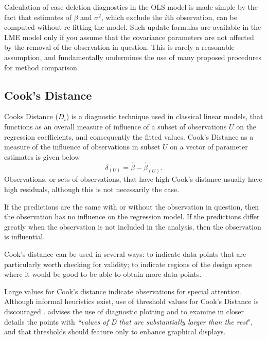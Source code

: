\documentclass[12pt, a4paper]{report}
\theoremstyle{definition}
\theoremstyle{remark}
\begin{document}
Calculation of case deletion diagnostics in the OLS model is made simple by the fact that estimates of $\beta$ and $\sigma^2$, which exclude the $i$th observation, can be computed without re-fitting the model. Such update formulas are available in the LME model only if you assume that the covariance parameters are not affected by the removal of the observation in question. This is rarely a reasonable assumption, and fundamentally undermines the use of many proposed procedures for method comparison.



\subsection{Cook's Distance}

 Cooks Distance ($D_{i}$) is a diagnostic technique used in classical linear models, that functions as an overall measure of influence of a subset of observations $U$ on the regression coefficients, and consequently the fitted values.  Cook's Distance as a measure of the influence of observations in subset $U$ on a vector of parameter estimates is given below \citep{cook77}
\[ \delta_{(U)} = \hat{\beta} - \hat{\beta}_{(U)}.\]
Observations, or sets of observations, that have high Cook's distance usually have high residuals, although this is not necessarily the case.


If the predictions are the same with or without the observation in question, then the observation has no influence on the regression model. If the predictions differ greatly when the observation is not included in the analysis, then the observation is influential.

 Cook's distance can be used in several ways: to indicate data points that are particularly worth checking for validity; to indicate regions of the design space where it would be good to be able to obtain more data points.


Large values for Cook's distance indicate observations for special attention. Although informal heuristics exist, use of threshold values for Cook's Distance is discouraged \citep{fox1991}. \citet{fox1991} advises the use of diagnostic plotting and to examine in closer details the points with \textit{``values of D that are substantially larger than the rest}", and that thresholds should feature only to enhance graphical displays.
\end{document}
